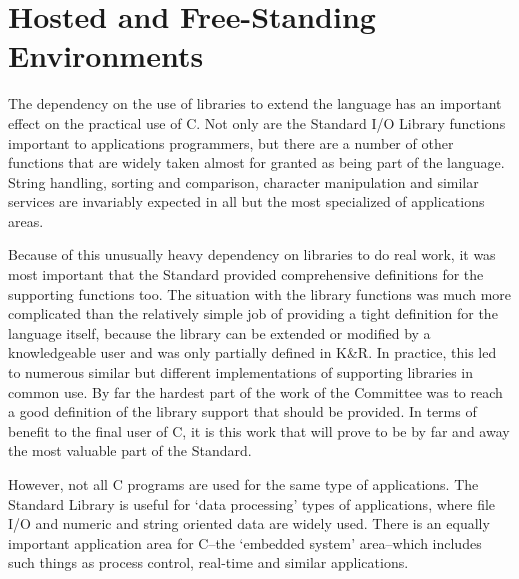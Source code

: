  
        \section*{Hosted and Free-Standing Environments}
        

  

  The dependency on the use of libraries to extend the language has an
   important effect on the practical use of C. Not only are the Standard
   I/O Library functions important to applications programmers, but there are
   a number of other functions that are widely taken almost for granted as
   being part of the language. String handling, sorting and comparison,
   character manipulation and similar services are invariably expected in all
   but the most specialized of applications areas.


  Because of this unusually heavy dependency on libraries to do real work,
   it was most important that the Standard provided comprehensive definitions
   for the supporting functions too. The situation with the library functions
   was much more complicated than the relatively simple job of providing a
   tight definition for the language itself, because the library can be
   extended or modified by a knowledgeable user and was only partially defined
   in K\&R. In practice, this led to numerous similar but different
   implementations of supporting libraries in common use. By far the hardest
   part of the work of the Committee was to reach a good definition of the
   library support that should be provided. In terms of benefit to the final
   user of C, it is this work that will prove to be by far and away the
   most valuable part of the Standard.


  However, not all C programs are used for the same type of applications.
   The Standard Library is useful for `data processing' types of
   applications, where file I/O and numeric and string oriented data are
   widely used. There is an equally important application area for C--the
   `embedded system' area--which includes such things as process
   control, real-time and similar applications.


